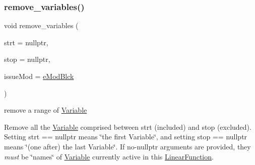 \subsubsection{\texorpdfstring{remove\+\_\+variables()}{remove\_variables()}\hspace{0.1cm}{\footnotesize\ttfamily [2/3]}}
{\footnotesize\ttfamily void remove\+\_\+variables (\begin{DoxyParamCaption}\item[{const \mbox{\hyperlink{class_s_m_spp__di__unipi__it_1_1_variable}{Variable}} $\ast$const}]{strt = {\ttfamily nullptr},  }\item[{const \mbox{\hyperlink{class_s_m_spp__di__unipi__it_1_1_variable}{Variable}} $\ast$const}]{stop = {\ttfamily nullptr},  }\item[{\mbox{\hyperlink{group___modification___t_y_p_e_s_ga544246d8c462e9a2d817c2c30797968f}{c\+\_\+\+Mod\+Param}}}]{issue\+Mod = {\ttfamily \mbox{\hyperlink{group___modification___t_y_p_e_s_gga48fddcdd03a03f49b7e389ca1ed938d4a21b14b26b1c0093a0905f6fc010bad29}{e\+Mod\+Blck}}} }\end{DoxyParamCaption})\hspace{0.3cm}{\ttfamily [inline]}}



remove a range of \mbox{\hyperlink{class_s_m_spp__di__unipi__it_1_1_variable}{Variable}} 

Remove all the \mbox{\hyperlink{class_s_m_spp__di__unipi__it_1_1_variable}{Variable}} comprised between strt (included) and stop (excluded). Setting strt == nullptr means \char`\"{}the first Variable\char`\"{}, and setting stop == nullptr means \char`\"{}(one after) the last Variable\char`\"{}. If no-\/nullptr arguments are provided, they {\itshape must} be \char`\"{}names\char`\"{} of \mbox{\hyperlink{class_s_m_spp__di__unipi__it_1_1_variable}{Variable}} currently active in this \mbox{\hyperlink{class_s_m_spp__di__unipi__it_1_1_linear_function}{Linear\+Function}}. \mbox{\label{class_s_m_spp__di__unipi__it_1_1_linear_function_a504a08a9d99543bc0740e4a2352e1e27}} 
